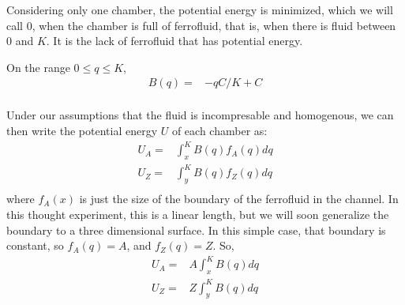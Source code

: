 \documentclass{asme2ej}
\begin{document}
Considering only one chamber, the potential energy is minimized, which
we will call $0$, when the chamber is full of ferrofluid, that is, when
there is fluid between 0 and $K$. It is the lack of ferrofluid that has
potential energy.

On the range $0 \leq q \leq K$,
\begin{align}
  B(q) = & -qC/K + C \\
\end{align}

Under our assumptions that the fluid is incompresable and homogenous,
we can then write the potential energy $U$ of each chamber as:
\begin{align}
  U_A = &\int_x^K B(q) f_A(q) dq \\
  U_Z = & \int_y^K B(q) f_Z(q) dq \\
\end{align}
where $f_A(x)$ is just the size of the boundary of the ferrofluid in the channel.
In this thought experiment, this is a linear length, but we will soon generalize the boundary to a three dimensional surface.
In this simple case, that boundary is constant, so $f_A(q) = A$, and
$f_Z(q) = Z$.
So,
\begin{align}
  U_A = & A \int_x^K B(q) dq \\
  U_Z = & Z \int_y^K B(q) dq \\
\end{align}
\end{document}
